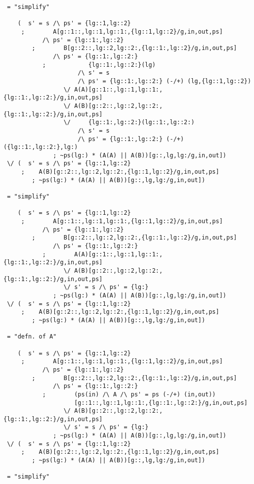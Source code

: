 \begin{verbatim}
 = "simplify"

    (  s' = s /\ ps' = {lg::1,lg::2}
     ;        A[g::1::,lg::1,lg::1:,{lg::1,lg::2}/g,in,out,ps]
           /\ ps' = {lg::1:,lg::2}
        ;        B[g::2::,lg::2,lg::2:,{lg::1:,lg::2}/g,in,out,ps]
              /\ ps' = {lg::1:,lg::2:}
           ;            {lg::1:,lg::2:}(lg)
                     /\ s' = s
                     /\ ps' = {lg::1:,lg::2:} (-/+) (lg,{lg::1,lg::2})
                 \/ A(A)[g::1::,lg::1,lg::1:,{lg::1:,lg::2:}/g,in,out,ps]
                 \/ A(B)[g::2::,lg::2,lg::2:,{lg::1:,lg::2:}/g,in,out,ps]
                 \/     {lg::1:,lg::2:}(lg::1:,lg::2:)
                     /\ s' = s
                     /\ ps' = {lg::1:,lg::2:} (-/+) ({lg::1:,lg::2:},lg:)
              ; ~ps(lg:) * (A(A) || A(B))[g::,lg,lg:/g,in,out])
 \/ (  s' = s /\ ps' = {lg::1,lg::2}
     ;    A(B)[g::2::,lg::2,lg::2:,{lg::1,lg::2}/g,in,out,ps]
        ; ~ps(lg:) * (A(A) || A(B))[g::,lg,lg:/g,in,out])

 = "simplify"

    (  s' = s /\ ps' = {lg::1,lg::2}
     ;        A[g::1::,lg::1,lg::1:,{lg::1,lg::2}/g,in,out,ps]
           /\ ps' = {lg::1:,lg::2}
        ;        B[g::2::,lg::2,lg::2:,{lg::1:,lg::2}/g,in,out,ps]
              /\ ps' = {lg::1:,lg::2:}
           ;        A(A)[g::1::,lg::1,lg::1:,{lg::1:,lg::2:}/g,in,out,ps]
                 \/ A(B)[g::2::,lg::2,lg::2:,{lg::1:,lg::2:}/g,in,out,ps]
                 \/ s' = s /\ ps' = {lg:}
              ; ~ps(lg:) * (A(A) || A(B))[g::,lg,lg:/g,in,out])
 \/ (  s' = s /\ ps' = {lg::1,lg::2}
     ;    A(B)[g::2::,lg::2,lg::2:,{lg::1,lg::2}/g,in,out,ps]
        ; ~ps(lg:) * (A(A) || A(B))[g::,lg,lg:/g,in,out])

 = "defn. of A"

    (  s' = s /\ ps' = {lg::1,lg::2}
     ;        A[g::1::,lg::1,lg::1:,{lg::1,lg::2}/g,in,out,ps]
           /\ ps' = {lg::1:,lg::2}
        ;        B[g::2::,lg::2,lg::2:,{lg::1:,lg::2}/g,in,out,ps]
              /\ ps' = {lg::1:,lg::2:}
           ;        (ps(in) /\ A /\ ps' = ps (-/+) (in,out))
                    [g::1::,lg::1,lg::1:,{lg::1:,lg::2:}/g,in,out,ps]
                 \/ A(B)[g::2::,lg::2,lg::2:,{lg::1:,lg::2:}/g,in,out,ps]
                 \/ s' = s /\ ps' = {lg:}
              ; ~ps(lg:) * (A(A) || A(B))[g::,lg,lg:/g,in,out])
 \/ (  s' = s /\ ps' = {lg::1,lg::2}
     ;    A(B)[g::2::,lg::2,lg::2:,{lg::1,lg::2}/g,in,out,ps]
        ; ~ps(lg:) * (A(A) || A(B))[g::,lg,lg:/g,in,out])

 = "simplify"


\end{verbatim}
